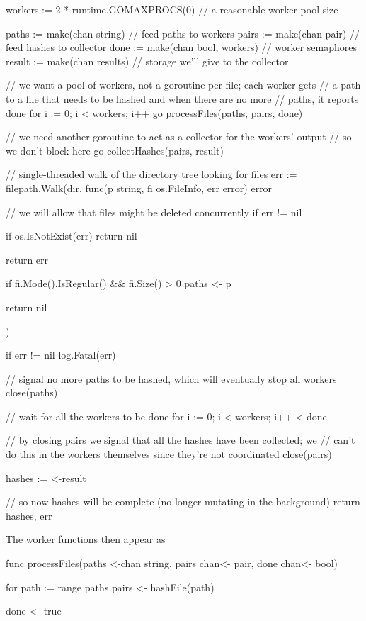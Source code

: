 \documentclass[12pt,notitlepage]{article}
\begin{document}
\begin{golang}
	workers := 2 * runtime.GOMAXPROCS(0) // a reasonable worker pool size

	paths := make(chan string)       // feed paths to workers
	pairs := make(chan pair)         // feed hashes to collector
	done := make(chan bool, workers) // worker semaphores
	result := make(chan results)     // storage we'll give to the collector

	// we want a pool of workers, not a goroutine per file; each worker gets
    // a path to a file that needs to be hashed and when there are no more
    // paths, it reports done
	for i := 0; i < workers; i++ {
		go processFiles(paths, pairs, done)
	}

	// we need another goroutine to act as a collector for the workers' output
    // so we don't block here
	go collectHashes(pairs, result)

	// single-threaded walk of the directory tree looking for files
	err := filepath.Walk(dir, func(p string, fi os.FileInfo, err error) error {
        // we will allow that files might be deleted concurrently
		if err != nil {
			if os.IsNotExist(err) {
				return nil
			}

			return err
		}

		if fi.Mode().IsRegular() && fi.Size() > 0 {
			paths <- p
		}

		return nil
	})

	if err != nil {
		log.Fatal(err)
	}

	// signal no more paths to be hashed, which will eventually stop all workers
	close(paths)

	// wait for all the workers to be done
	for i := 0; i < workers; i++ {
		<-done
	}

	// by closing pairs we signal that all the hashes have been collected; we
    // can't do this in the workers themselves since they're not coordinated
	close(pairs)

	hashes := <-result

	// so now hashes will be complete (no longer mutating in the background)
	return hashes, err
\end{golang}

The worker functions then appear as

\begin{golang}
func processFiles(paths <-chan string, pairs chan<- pair, done chan<- bool) {
	for path := range paths {
		pairs <- hashFile(path)
	}

	done <- true
}
\end{golang}
\end{document}
